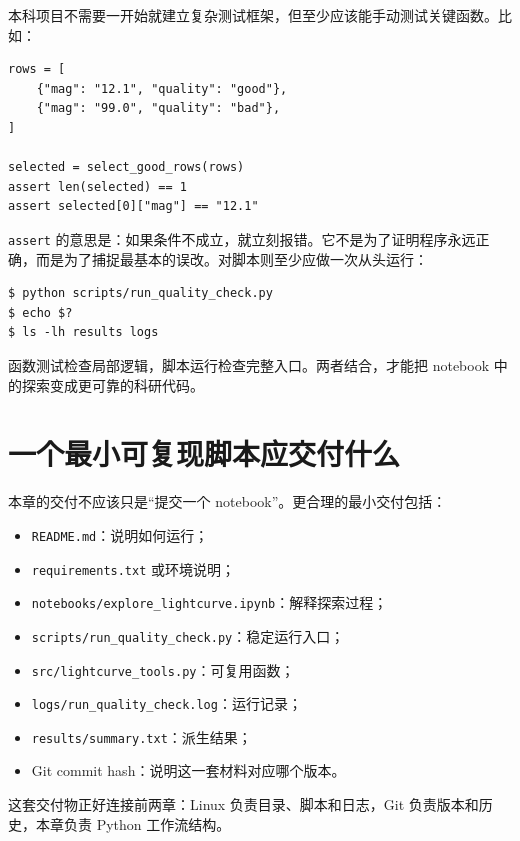 本科项目不需要一开始就建立复杂测试框架，但至少应该能手动测试关键函数。比如：

\begin{examplebox}[最小函数测试]
\begin{lstlisting}[style=pythonstyle]
rows = [
    {"mag": "12.1", "quality": "good"},
    {"mag": "99.0", "quality": "bad"},
]

selected = select_good_rows(rows)
assert len(selected) == 1
assert selected[0]["mag"] == "12.1"
\end{lstlisting}
\end{examplebox}

\texttt{assert} 的意思是：如果条件不成立，就立刻报错。它不是为了证明程序永远正确，而是为了捕捉最基本的误改。对脚本则至少应做一次从头运行：

\begin{lstlisting}[style=terminal]
$ python scripts/run_quality_check.py
$ echo $?
$ ls -lh results logs
\end{lstlisting}

函数测试检查局部逻辑，脚本运行检查完整入口。两者结合，才能把 notebook 中的探索变成更可靠的科研代码。

\section{一个最小可复现脚本应交付什么}

本章的交付不应该只是“提交一个 notebook”。更合理的最小交付包括：

\begin{itemize}
    \item \texttt{README.md}：说明如何运行；
    \item \texttt{requirements.txt} 或环境说明；
    \item \texttt{notebooks/explore\_lightcurve.ipynb}：解释探索过程；
    \item \texttt{scripts/run\_quality\_check.py}：稳定运行入口；
    \item \texttt{src/lightcurve\_tools.py}：可复用函数；
    \item \texttt{logs/run\_quality\_check.log}：运行记录；
    \item \texttt{results/summary.txt}：派生结果；
    \item Git commit hash：说明这一套材料对应哪个版本。
\end{itemize}

这套交付物正好连接前两章：Linux 负责目录、脚本和日志，Git 负责版本和历史，本章负责 Python 工作流结构。

